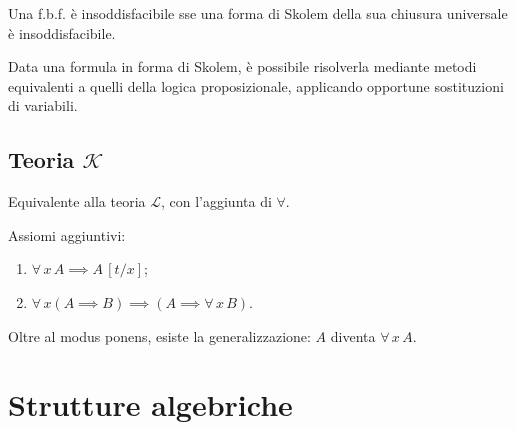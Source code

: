 \documentclass[10pt]{article}
\begin{document}
            Una f.b.f. è insoddisfacibile sse una forma di Skolem della sua chiusura universale è insoddisfacibile.

            Data una formula in forma di Skolem, è possibile risolverla mediante metodi equivalenti a quelli della logica
            proposizionale, applicando opportune sostituzioni di variabili. 

        \subsection*{Teoria \(\mathcal{K}\)}

            Equivalente alla teoria \(\mathcal{L}\), con l'aggiunta di \(\forall\).

            Assiomi aggiuntivi:
            \begin{enumerate}
                \item \(\forall \, x \, A \implies A \, [t/x]\);
                \item \(\forall \, x \left(A \implies B\right) \implies \left(A \implies \forall \, x \, B\right)\).
            \end{enumerate}
            Oltre al modus ponens, esiste la generalizzazione: \(A\) diventa \(\forall \, x \, A\).

    \section*{Strutture algebriche}
\end{document}
